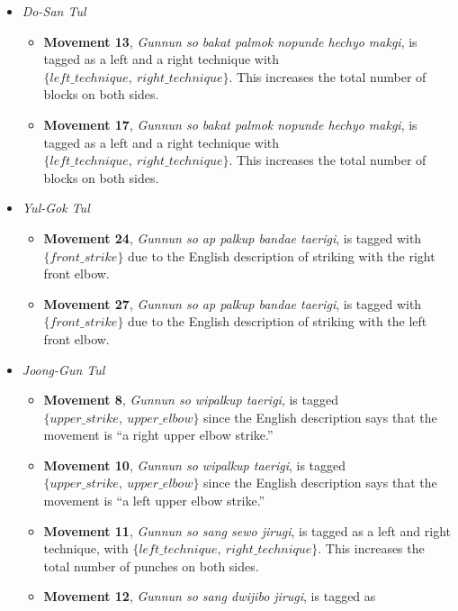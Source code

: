 \documentclass[10pt,twocolumn,a4paper]{article}
\begin{document}
\begin{itemize}
  \item
    \emph{Do-San Tul}
    \begin{itemize}
      \item
        {\bf Movement 13}, \emph{Gunnun so bakat palmok nopunde hechyo makgi},
        is tagged as a left and a right technique with $\{left\_technique, \:
        right\_technique\}$. This increases the total number of blocks on both
        sides.
      \item
        {\bf Movement 17}, \emph{Gunnun so bakat palmok nopunde hechyo makgi},
        is tagged as a left and a right technique with $\{left\_technique, \:
        right\_technique\}$. This increases the total number of blocks on both
        sides.
    \end{itemize}
  \item
    \emph{Yul-Gok Tul}
    \begin{itemize}
      \item
        {\bf Movement 24}, \emph{Gunnun so ap palkup bandae taerigi}, is
        tagged with $\{front\_strike\}$ due to the English description of
        striking with the right front elbow.
      \item
        {\bf Movement 27}, \emph{Gunnun so ap palkup bandae taerigi}, is
        tagged with $\{front\_strike\}$ due to the English description of
        striking with the left front elbow.
    \end{itemize}
  \item
    \emph{Joong-Gun Tul}
    \begin{itemize}
      \item
        {\bf Movement 8}, \emph{Gunnun so wipalkup taerigi}, is tagged
        $\{upper\_strike, \: upper\_elbow\}$ since the English description
        says that the movement is ``a right upper elbow strike.''
      \item
        {\bf Movement 10}, \emph{Gunnun so wipalkup taerigi}, is tagged
        $\{upper\_strike, \: upper\_elbow\}$ since the English description
        says that the movement is ``a left upper elbow strike.''
      \item
        {\bf Movement 11}, \emph{Gunnun so sang sewo jirugi}, is tagged as a
        left and right technique, with $\{left\_technique, \:
        right\_technique\}$. This increases the total number of punches on
        both sides.
      \item
        {\bf Movement 12}, \emph{Gunnun so sang dwijibo jirugi}, is tagged as

\end{itemize}
\end{itemize}
\end{document}
